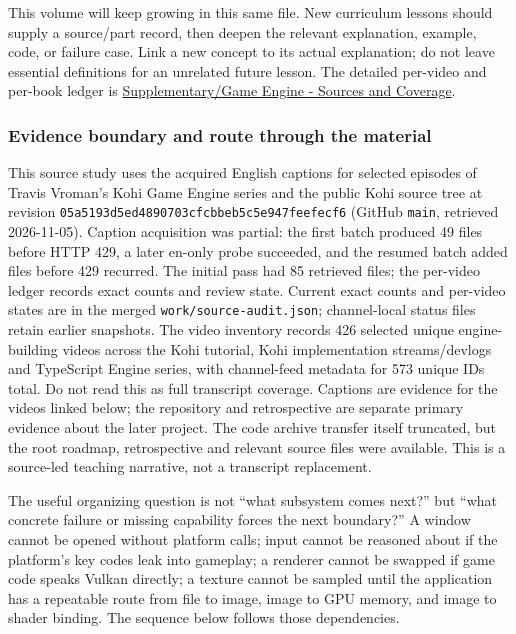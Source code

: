 This volume will keep growing in this same file. New curriculum lessons should supply a source/part record, then deepen the relevant explanation, example, code, or failure case. Link a new concept to its actual explanation; do not leave essential definitions for an unrelated future lesson. The detailed per-video and per-book ledger is \hyperref[appendix-877738f6f4d2]{Supplementary/Game Engine - Sources and Coverage}.

\subsubsection{Evidence boundary and route through the material}\label{06-engine-ii-ch042-evidence-boundary-and-route-through-the-material}

\hypertarget{06-engine-ii-ch042-evidence-boundary-and-route-through-the-material}{}

This source study uses the acquired English captions for selected episodes of Travis Vroman's Kohi Game Engine series and the public Kohi source tree at revision \texttt{05a5193d5ed4890703cfcbbeb5c5e947feefecf6} (GitHub \texttt{main}, retrieved 2026-11-05). Caption acquisition was partial: the first batch produced 49 files before HTTP 429, a later en-only probe succeeded, and the resumed batch added files before 429 recurred. The initial pass had 85 retrieved files; the per-video ledger records exact counts and review state. Current exact counts and per-video states are in the merged \texttt{work/source-audit.json}; channel-local status files retain earlier snapshots. The video inventory records 426 selected unique engine-building videos across the Kohi tutorial, Kohi implementation streams/devlogs and TypeScript Engine series, with channel-feed metadata for 573 unique IDs total. Do not read this as full transcript coverage. Captions are evidence for the videos linked below; the repository and retrospective are separate primary evidence about the later project. The code archive transfer itself truncated, but the root roadmap, retrospective and relevant source files were available. This is a source-led teaching narrative, not a transcript replacement.

The useful organizing question is not ``what subsystem comes next?'' but ``what concrete failure or missing capability forces the next boundary?'' A window cannot be opened without platform calls; input cannot be reasoned about if the platform's key codes leak into gameplay; a renderer cannot be swapped if game code speaks Vulkan directly; a texture cannot be sampled until the application has a repeatable route from file to image, image to GPU memory, and image to shader binding. The sequence below follows those dependencies.

